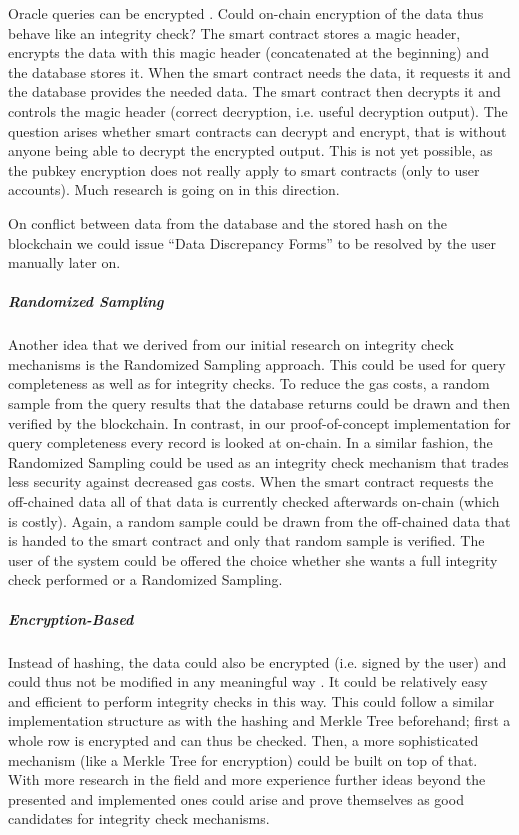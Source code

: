 Oracle queries can be encrypted \cite{futureWork01}. Could on-chain encryption of the data thus behave like an integrity check? The smart contract stores a magic header, encrypts the data with this magic header (concatenated at the beginning) and the database stores it.
When the smart contract needs the data, it requests it and the database provides the needed data. The smart contract then decrypts it and controls the magic header (correct decryption, i.e. useful decryption output).
The question arises whether smart contracts can decrypt and encrypt, that is without anyone being able to decrypt the encrypted output. This is not yet possible, as the pubkey encryption does not really apply to smart contracts (only to user accounts). Much research is going on in this direction.

On conflict between data from the database and the stored hash on the blockchain we could issue “Data Discrepancy Forms” to be resolved by the user manually later on.

\subparagraph{Randomized Sampling}
Another idea that we derived from our initial research on integrity check mechanisms is the Randomized Sampling approach. This could be used for query completeness as well as for integrity checks.
To reduce the gas costs, a random sample from the query results that the database returns could be drawn and then verified by the blockchain. In contrast, in our proof-of-concept implementation for query completeness every record is looked at on-chain.
In a similar fashion, the Randomized Sampling could be used as an integrity check mechanism that trades less security against decreased gas costs. When the smart contract requests the off-chained data all of that data is currently checked afterwards on-chain (which is costly). Again, a random sample could be drawn from the off-chained data that is handed to the smart contract and only that random sample is verified. The user of the system could be offered the choice whether she wants a full integrity check performed or a Randomized Sampling.

\subparagraph{Encryption-Based}
Instead of hashing, the data could also be encrypted (i.e. signed by the user) and could thus not be modified in any meaningful way \cite{Eberhardt}. It could be relatively easy and efficient to perform integrity checks in this way.
This could follow a similar implementation structure as with the hashing and Merkle Tree beforehand; first a whole row is encrypted and can thus be checked. Then, a more sophisticated mechanism (like a Merkle Tree for encryption) could be built on top of that. With more research in the field and more experience further ideas beyond the presented and implemented ones could arise and prove themselves as good candidates for integrity check mechanisms.


